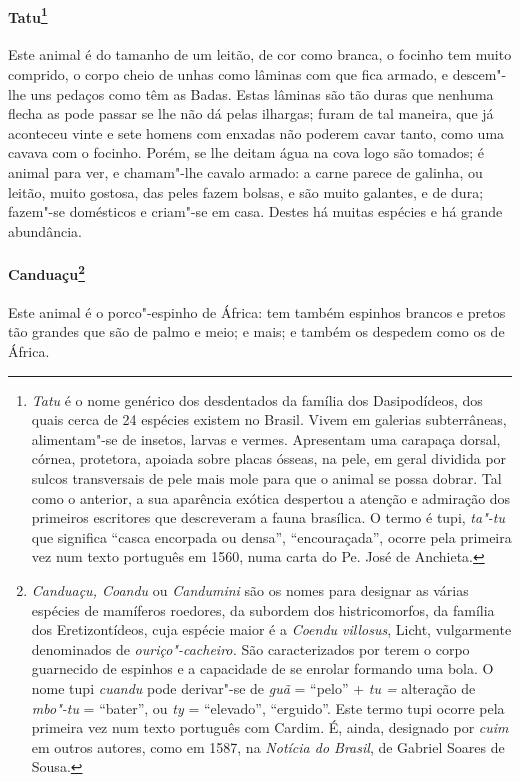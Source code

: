 \paragraph{Tatu\footnote{ \textit{Tatu} é o nome genérico dos
desdentados da família dos Dasipodídeos, dos quais cerca de 24 
espécies existem no Brasil. Vivem em galerias subterrâneas,
alimentam"-se de insetos, larvas e vermes. Apresentam uma carapaça
dorsal, córnea, protetora, apoiada sobre placas ósseas, na pele, em
geral dividida por sulcos transversais de pele mais mole para que o
animal se possa dobrar. Tal como o anterior, a sua aparência exótica
despertou a atenção e admiração dos primeiros escritores que
descreveram a fauna brasílica. O termo é tupi, \textit{ta"-tu} que
significa ``casca encorpada ou densa'', ``encouraçada'', ocorre pela
primeira vez num texto português em 1560, numa carta do Pe.
José de Anchieta.}} Este animal é do tamanho de um leitão, de
cor como branca, o focinho tem muito comprido, o corpo cheio de unhas
como lâminas com que fica armado, e descem"-lhe uns pedaços como têm as
Badas. Estas lâminas são tão duras que nenhuma flecha as pode passar se
lhe não dá pelas ilhargas; furam de tal maneira, que já aconteceu vinte
e sete homens com enxadas não poderem cavar tanto, como uma cavava com
o focinho. Porém, se lhe deitam água na cova logo são tomados; é animal
para ver, e chamam"-lhe cavalo armado: a carne parece de galinha, ou
leitão, muito gostosa, das peles fazem bolsas, e são muito galantes, e
de dura; fazem"-se domésticos e criam"-se em casa.
 Destes há muitas espécies e há grande abundância.

\paragraph{Canduaçu\footnote{ \textit{Canduaçu, Coandu} ou
\textit{Candumini} são os nomes para designar as várias espécies de
mamíferos roedores, da subordem dos histricomorfos, da família dos
Eretizontídeos, cuja espécie maior é a \textit{Coendu villosus}, 
Licht, vulgarmente denominados de \textit{ouriço"-cacheiro.} São
caracterizados por terem o corpo guarnecido de espinhos e a capacidade
de se enrolar formando uma bola. O nome tupi \textit{cuandu} pode
derivar"-se de \textit{guã} = ``pelo'' + \textit{tu =} alteração de
\textit{mbo"-tu} = ``bater'', ou \textit{ty} = ``elevado'', ``erguido''. Este
termo tupi ocorre pela primeira vez num texto português com Cardim. É,
ainda, designado por \textit{cuim} em outros autores, como em 1587, na
\textit{Notícia do Brasil}, de Gabriel Soares de Sousa.}} Este
animal é o porco"-espinho de África: tem também espinhos brancos e
pretos tão grandes que são de palmo e meio; e mais; e também os
despedem como os de África.


